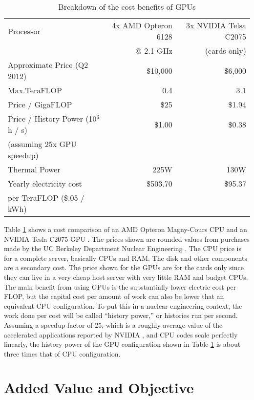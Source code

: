 \begin{table}[h]
\centering
\caption{Breakdown of the cost benefits of GPUs \cite{cost_sheets1,cost_sheets2,c2075,opterondate}}
\label{gpu_money}
\begin{tabular}{| l | r | r |}
\hline
Processor & 4x AMD Opteron 6128  & 3x NVIDIA Telsa C2075 \\
  & @ 2.1 GHz &  (cards only)  \\
\hline
\hline
Approximate Price (Q2 2012)& \$10,000 & \$6,000 \\
\hline
Max.TeraFLOP & 0.4 & 3.1 \\
\hline
Price / GigaFLOP & \$25 & \$1.94 \\
\hline
Price / History Power (10$^3$ h / s) & \$1.00 & \$0.38 \\
(assuming 25x GPU speedup) & & \\
\hline
Thermal Power & 225W & 130W \\
\hline
Yearly electricity cost & \$503.70  & \$95.37 \\
per TeraFLOP (\$.05 / kWh)   & & \\
\hline
\end{tabular}
\end{table}

Table \ref{gpu_money} shows a cost comparison of an AMD Opteron Magny-Cours CPU and an NVIDIA Tesla C2075 GPU \cite{cpu_latency,cuda}.  The prices shown are rounded values from purchases made by the UC Berkeley Department Nuclear Engineering \cite{cost_sheets1,cost_sheets2}.  The CPU price is for a complete server, basically CPUs and RAM.  The disk and  other components are a secondary cost.  The price shown for the GPUs are for the cards only since they can live in a very cheap host server with very little RAM and budget CPUs.  The main benefit from using GPUs is the substantially lower electric cost per FLOP, but the capital cost per amount of work can also be lower that an equivalent CPU configuration.  To put this in a nuclear engineering context, the work done per cost will be called ``history power,'' or histories run per second.  Assuming a speedup factor of 25, which is a roughly average value of the accelerated applications reported by NVIDIA \cite{nvidia_speedups}, and CPU codes scale perfectly linearly, the history power of the GPU configuration shown in Table \ref{gpu_money} is about three times that of CPU configuration.  



\section{Added Value and Objective}

